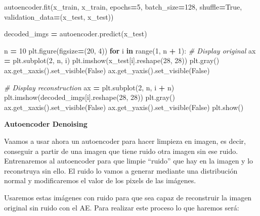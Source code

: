 \documentclass[
  a4paper,
  DIV=11,
  numbers=noendperiod]{scrreprt}
\newenvironment{Shaded}{\begin{snugshade}}{\end{snugshade}}
\newcommand{\BuiltInTok}[1]{#1}
\newcommand{\CommentTok}[1]{\textcolor[rgb]{0.56,0.35,0.01}{\textit{#1}}}
\newcommand{\ControlFlowTok}[1]{\textcolor[rgb]{0.13,0.29,0.53}{\textbf{#1}}}
\newcommand{\DecValTok}[1]{\textcolor[rgb]{0.00,0.00,0.81}{#1}}
\newcommand{\KeywordTok}[1]{\textcolor[rgb]{0.13,0.29,0.53}{\textbf{#1}}}
\newcommand{\NormalTok}[1]{#1}
\newcommand{\OperatorTok}[1]{\textcolor[rgb]{0.81,0.36,0.00}{\textbf{#1}}}
\newcommand{\VariableTok}[1]{\textcolor[rgb]{0.00,0.00,0.00}{#1}}
\begin{document}
\begin{Shaded}
\begin{Highlighting}[numbers=left,,]
\NormalTok{autoencoder.fit(x\_train, x\_train,}
\NormalTok{                epochs}\OperatorTok{=}\DecValTok{5}\NormalTok{,}
\NormalTok{                batch\_size}\OperatorTok{=}\DecValTok{128}\NormalTok{,}
\NormalTok{                shuffle}\OperatorTok{=}\VariableTok{True}\NormalTok{,}
\NormalTok{                validation\_data}\OperatorTok{=}\NormalTok{(x\_test, x\_test))}

\NormalTok{decoded\_imgs }\OperatorTok{=}\NormalTok{ autoencoder.predict(x\_test)}

\NormalTok{n }\OperatorTok{=} \DecValTok{10}
\NormalTok{plt.figure(figsize}\OperatorTok{=}\NormalTok{(}\DecValTok{20}\NormalTok{, }\DecValTok{4}\NormalTok{))}
\ControlFlowTok{for}\NormalTok{ i }\KeywordTok{in} \BuiltInTok{range}\NormalTok{(}\DecValTok{1}\NormalTok{, n }\OperatorTok{+} \DecValTok{1}\NormalTok{):}
    \CommentTok{\# Display original}
\NormalTok{    ax }\OperatorTok{=}\NormalTok{ plt.subplot(}\DecValTok{2}\NormalTok{, n, i)}
\NormalTok{    plt.imshow(x\_test[i].reshape(}\DecValTok{28}\NormalTok{, }\DecValTok{28}\NormalTok{))}
\NormalTok{    plt.gray()}
\NormalTok{    ax.get\_xaxis().set\_visible(}\VariableTok{False}\NormalTok{)}
\NormalTok{    ax.get\_yaxis().set\_visible(}\VariableTok{False}\NormalTok{)}

    \CommentTok{\# Display reconstruction}
\NormalTok{    ax }\OperatorTok{=}\NormalTok{ plt.subplot(}\DecValTok{2}\NormalTok{, n, i }\OperatorTok{+}\NormalTok{ n)}
\NormalTok{    plt.imshow(decoded\_imgs[i].reshape(}\DecValTok{28}\NormalTok{, }\DecValTok{28}\NormalTok{))}
\NormalTok{    plt.gray()}
\NormalTok{    ax.get\_xaxis().set\_visible(}\VariableTok{False}\NormalTok{)}
\NormalTok{    ax.get\_yaxis().set\_visible(}\VariableTok{False}\NormalTok{)}
\NormalTok{plt.show()}

\end{Highlighting}
\end{Shaded}

\textbf{Autoencoder Denoising}

Vaamos a usar ahora un autoencoder para hacer limpieza en imagen, es
decir, conseguir a partir de una imagen que tiene ruido otra imagen sin
ese ruido. Entrenaremos al autoencoder para que limpie ``ruido'' que hay
en la imagen y lo reconstruya sin ello. El ruido lo vamos a generar
mediante una distribución normal y modificaremos el valor de los pixels
de las imágenes.

Usaremos estas imágenes con ruido para que sea capaz de reconstruir la
imagen original sin ruido con el AE. Para realizar este proceso lo que
haremos será:
\end{document}
